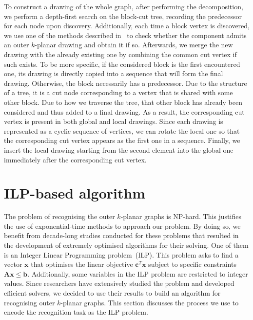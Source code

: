 To construct a drawing of the whole graph, after performing the decomposition, we perform a depth-first search on the block-cut tree, recording the predecessor for each node upon discovery. Additionally, each time a block vertex is discovered, we use one of the methods described in~ to check whether the component admits an outer \(k\)-planar drawing and obtain it if so. Afterwards, we merge the new drawing with the already existing one by combining the common cut vertex if such exists. To be more specific, if the considered block is the first encountered one, its drawing is directly copied into a sequence that will form the final drawing. Otherwise, the block necessarily has a predecessor. Due to the structure of a tree, it is a cut node corresponding to a vertex that is shared with some other block. Due to how we traverse the tree, that other block has already been considered and thus added to a final drawing. As a result, the corresponding cut vertex is present in both global and local drawings. Since each drawing is represented as a cyclic sequence of vertices, we can rotate the local one so that the corresponding cut vertex appears as the first one in a sequence. Finally, we insert the local drawing starting from the second element into the global one immediately after the corresponding cut vertex.


\section{ILP-based algorithm}\label{sec:ILP-def}

The problem of recognising the outer \(k\)-planar graphs is NP-hard. This justifies the use of exponential-time methods to approach our problem. By doing so, we benefit from decade-long studies conducted for these problems that resulted in the development of extremely optimised algorithms for their solving. One of them is an Integer Linear Programming problem~(ILP). This problem asks to find a vector \(\mathbf{x}\) that optimises the linear objective \(\mathbf{c}^T\mathbf{x}\) subject to specific constraints \(\mathbf{Ax}\leqslant\mathbf{b}\). Additionally, some variables in the ILP problem are restricted to integer values. Since researchers have extensively studied the problem and developed efficient solvers, we decided to use their results to build an algorithm for recognising outer \(k\)-planar graphs. This section discusses the process we use to encode the recognition task as the ILP problem.

